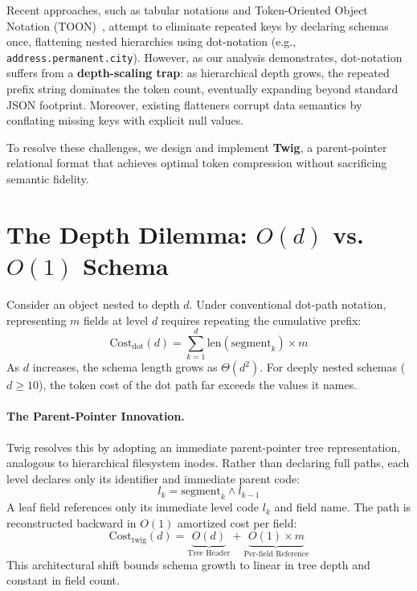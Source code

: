 \documentclass[11pt,a4paper]{article}
\begin{document}
Recent approaches, such as tabular notations and Token-Oriented Object Notation (TOON)~\cite{badertoon2024}, attempt to eliminate repeated keys by declaring schemas once, flattening nested hierarchies using dot-notation (e.g., \texttt{address.permanent.city}). However, as our analysis demonstrates, dot-notation suffers from a \textbf{depth-scaling trap}: as hierarchical depth grows, the repeated prefix string dominates the token count, eventually expanding beyond standard JSON footprint. Moreover, existing flatteners corrupt data semantics by conflating missing keys with explicit null values.

To resolve these challenges, we design and implement \textbf{Twig}, a parent-pointer relational format that achieves optimal token compression without sacrificing semantic fidelity.

\section{The Depth Dilemma: $O(d)$ vs. $O(1)$ Schema}
\label{sec:depth_dilemma}

Consider an object nested to depth $d$. Under conventional dot-path notation, representing $m$ fields at level $d$ requires repeating the cumulative prefix:
\begin{equation}
\text{Cost}_{\text{dot}}(d) = \sum_{k=1}^d \text{len}(\text{segment}_k) \times m
\end{equation}
As $d$ increases, the schema length grows as $\Theta(d^2)$. For deeply nested schemas ($d \ge 10$), the token cost of the dot path far exceeds the values it names.

\paragraph{The Parent-Pointer Innovation.} Twig resolves this by adopting an immediate parent-pointer tree representation, analogous to hierarchical filesystem inodes. Rather than declaring full paths, each level declares only its identifier and immediate parent code:
\begin{equation}
l_k = \text{segment}_k \wedge l_{k-1}
\end{equation}
A leaf field references only its immediate level code $l_k$ and field name. The path is reconstructed backward in $O(1)$ amortized cost per field:
\begin{equation}
\text{Cost}_{\text{twig}}(d) = \underbrace{O(d)}_{\text{Tree Header}} + \underbrace{O(1) \times m}_{\text{Per-field Reference}}
\end{equation}
This architectural shift bounds schema growth to linear in tree depth and constant in field count.
\end{document}
